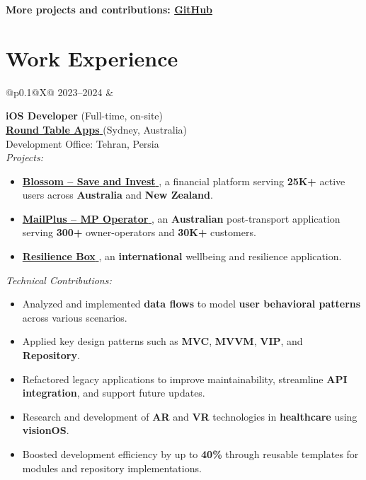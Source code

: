 \documentclass[letter,10pt]{article}
\makeatletter
\newcommand{\cventry}[2]{%
    \noindent
    \begin{tabularx}{\textwidth}{%
        @{}p{0.1\textwidth}@{\hspace{0.2cm}}X@{}
    }
        #1 &
        \begin{minipage}[t]{\linewidth}
            #2
        \end{minipage}
    \end{tabularx}%
    \par\vspace{1.1em}%
}
\makeatother
\begin{document}
\textbf{\small More projects and contributions: { }\href{https://github.com/karami-mehdi}{ GitHub }}

\section*{Work Experience}
\cventry{2023--2024}{
    \textbf{iOS Developer} (Full-time, on-site)\\
    \href{https://roundtableapps.com}{\textbf{ Round Table Apps} } (Sydney, Australia)\\
    Development Office: Tehran, Persia\\[2.5pt]
    \textit{Projects:}
    \begin{itemize}[label={}, nosep, leftmargin=0pt]
        \item \href{https://www.blossomapp.com}{\textbf{ Blossom -- Save and Invest }} , a financial platform serving \textbf{25K+} active users across \textbf{Australia} and \textbf{New Zealand}.
        \item \href{https://mailplus.com.au}{\textbf{ MailPlus -- MP Operator }} , an \textbf{Australian} post-transport application serving \textbf{300+} owner-operators and \textbf{30K+} customers.
        \item \href{https://app.resiliencebox.com}{\textbf{ Resilience Box }} , an \textbf{international} wellbeing and resilience application.\\[-6.5pt]
    \end{itemize}
    \textit{Technical Contributions:}
    \begin{itemize}[label={}, nosep, leftmargin=0pt]
        \item Analyzed and implemented \textbf{data flows} to model \textbf{user behavioral patterns} across various scenarios.
        \item Applied key design patterns such as \textbf{MVC}, \textbf{MVVM}, \textbf{VIP}, and \textbf{Repository}.
        \item Refactored legacy applications to improve maintainability, streamline \textbf{API integration}, and support future updates.
        \item Research and development of \textbf{AR} and \textbf{VR} technologies in \textbf{healthcare} using \textbf{visionOS}.
        \item Boosted development efficiency by up to \textbf{40\%} through reusable templates for modules and repository implementations. \\ [-15pt]
    \end{itemize}
}
\end{document}
